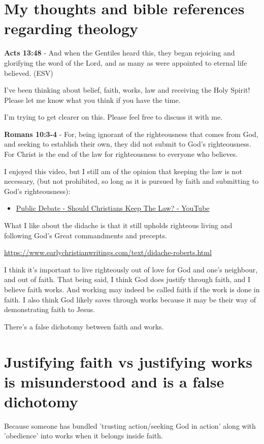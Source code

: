 \documentclass[11pt]{article}
\author{root}
\date{\today}
\title{}
\begin{document}
\section{My thoughts and bible references regarding theology}
\label{sec:orgc17be05}
\textbf{Acts 13:48} - And when the Gentiles heard this, they began rejoicing and glorifying the word of the Lord, and as many as were appointed to eternal life believed. (ESV)

I've been thinking about belief, faith, works, law and receiving the Holy Spirit!
Please let me know what you think if you have the time.

I'm trying to get clearer on this.
Please feel free to discuss it with me.

\textbf{Romans 10:3-4} - For, being ignorant of the righteousness that comes from God, and seeking to establish their own, they did not submit to God's righteousness. For Christ is the end of the law for righteousness to everyone who believes.

I enjoyed this video, but I still am of the opinion that keeping the law is not necessary, (but not prohibited, so long as it is pursued by faith and submitting to God's righteousness):
\begin{itemize}
\item \href{https://www.youtube.com/watch?v=CNHKqhwu6Bo}{Public Debate - Should Christians Keep The Law? - YouTube}
\end{itemize}

What I like about the didache is that it still upholds righteous living and following God's Great commandments and precepts.

\url{https://www.earlychristianwritings.com/text/didache-roberts.html}

I think it's important to live righteously out of love for God and one's neighbour, and out of faith.
That being said, I think God does justify through faith, and I believe faith works. And working may indeed be called faith if the work is done in faith.
I also think God likely saves through works because it may be their way of demonstrating faith to Jesus.

There's a false dichotomy between faith and works.

\section{Justifying faith vs justifying works is misunderstood and is a false dichotomy}
\label{sec:orge59d3cc}
Because someone has bundled 'trusting
action/seeking God in action' along with
'obedience' into works when it belongs inside
faith.
\end{document}
